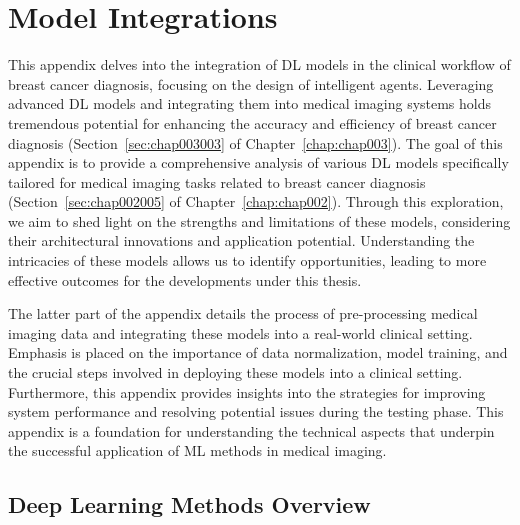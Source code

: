 \chapter{Model Integrations}
\label{chap:app004}

This appendix delves into the integration of \ac{DL} models in the clinical workflow of breast cancer diagnosis, focusing on the design of intelligent agents.
Leveraging advanced \ac{DL} models and integrating them into medical imaging systems holds tremendous potential for enhancing the accuracy and efficiency of breast cancer diagnosis (Section~\ref{sec:chap003003} of Chapter~\ref{chap:chap003}).
The goal of this appendix is to provide a comprehensive analysis of various \ac{DL} models specifically tailored for medical imaging tasks related to breast cancer diagnosis (Section~\ref{sec:chap002005} of Chapter~\ref{chap:chap002}).
Through this exploration, we aim to shed light on the strengths and limitations of these models, considering their architectural innovations and application potential.
Understanding the intricacies of these models allows us to identify opportunities, leading to more effective outcomes for the developments under this thesis.

The latter part of the appendix details the process of pre-processing medical imaging data and integrating these models into a real-world clinical setting.
Emphasis is placed on the importance of data normalization, model training, and the crucial steps involved in deploying these models into a clinical setting.
Furthermore, this appendix provides insights into the strategies for improving system performance and resolving potential issues during the testing phase.
This appendix is a foundation for understanding the technical aspects that underpin the successful application of \ac{ML} methods in medical imaging.

\section{Deep Learning Methods Overview}
\label{sec:app004001}

